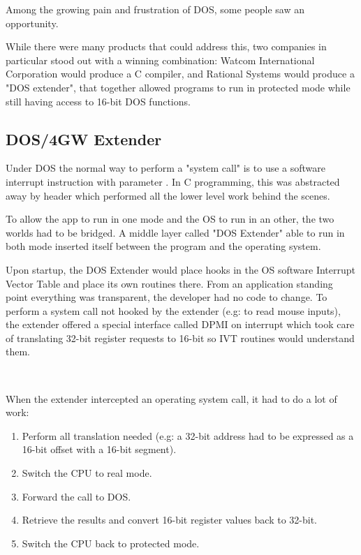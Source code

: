 \par
Among the growing pain and frustration of DOS, some people saw an opportunity.\newpage 

While there were many products that could address this, two companies in particular stood out with a winning combination: Watcom International Corporation would produce a C compiler, and Rational Systems would produce a "DOS extender", that together allowed programs to run in protected mode while still having access to 16-bit DOS functions.\\
\par


\subsection{DOS/4GW Extender}
Under DOS the normal way to perform a "system call" is to use a software interrupt instruction with parameter . In C programming, this was abstracted away by header  which performed all the lower level work behind the scenes.\\
\par
{}
To allow the app to run in one mode and the OS to run in an other, the two worlds had to be bridged. A middle layer called "DOS Extender" able to run in both mode inserted itself between the program and the operating system.\\

\par
{}
Upon startup, the DOS Extender would place hooks in the OS software Interrupt Vector Table and place its own routines there. From an application standing point everything was transparent, the developer had no code to change. To perform a system call not hooked by the extender (e.g:  to read mouse inputs), the extender offered a special interface called DPMI on interrupt  which took care of translating 32-bit register requests to 16-bit so IVT routines would understand them.\\
\par
{}\\
\par
When the extender intercepted an operating system call, it had to do a lot of work:
\begin{enumerate}
\item Perform all translation needed (e.g: a 32-bit address had to be expressed as a 16-bit offset with a 16-bit segment).
\item Switch the CPU to real mode.
\item Forward the call to DOS.
\item Retrieve the results and convert 16-bit register values back to 32-bit.
\item Switch the CPU back to protected mode.
\end{enumerate} 

